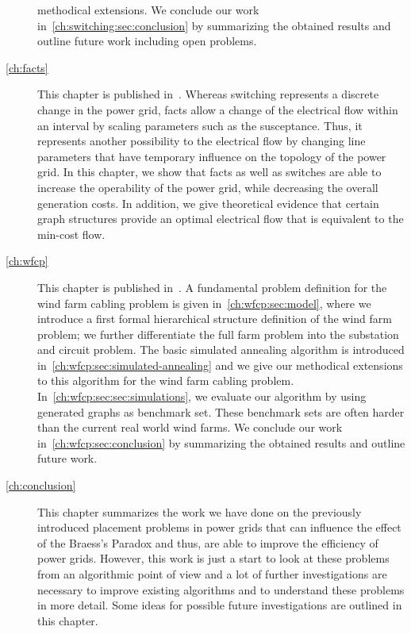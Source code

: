 \begin{description}
    methodical extensions. We conclude our work
    in~\cref{ch:switching:sec:conclusion} by summarizing the obtained results
    and outline future work including open problems.
    \item[\cref{ch:facts}] This chapter is published
    in~\parencite{Mch15,Lei15,Lei15b}. Whereas switching represents a discrete
    change in the power grid, \gls{facts} allow a change of the electrical flow
    within an interval by scaling parameters such as the susceptance. Thus, it
    represents another possibility to  the electrical flow
    by changing line parameters that have temporary influence on the topology of
    the power grid. In this chapter, we show that \gls{facts} as well as
    switches are able to increase the operability of the power grid, while
    decreasing the overall generation costs. In addition, we give theoretical
    evidence that certain graph structures provide an optimal electrical flow
    that is equivalent to the min-cost flow.
    \item[\cref{ch:wfcp}] This chapter is
    published in~\parencite{Leh17}. A fundamental problem definition for the
    wind farm cabling problem is given in~\cref{ch:wfcp:sec:model}, where we
    introduce a first formal hierarchical structure definition of the wind farm
    problem; we further differentiate the full farm problem into the substation
    and circuit problem. The basic simulated annealing algorithm is introduced
    in~\cref{ch:wfcp:sec:simulated-annealing} and we give our methodical
    extensions to this algorithm for the wind farm cabling problem.
    In~\cref{ch:wfcp:sec:sec:simulations}, we evaluate our algorithm by using
    generated graphs as benchmark set. These benchmark sets are often harder
    than the current real world wind farms. We conclude our work
    in~\cref{ch:wfcp:sec:conclusion} by summarizing the obtained results and
    outline future work.
    \item[\cref{ch:conclusion}] This chapter summarizes the work we have done on
    the previously introduced placement problems in power grids that can
    influence the effect of the Braess's Paradox and thus, are able to improve
    the efficiency of power grids. However, this work is just a start to look at
    these problems from an algorithmic point of view and a lot of further
    investigations are necessary to improve existing algorithms and to
    understand these problems in more detail. Some ideas for possible future
    investigations are outlined in this chapter.
\end{description}
